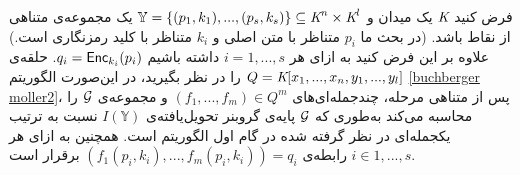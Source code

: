 \begin{proposition}
فرض کنید 
$\textit{K}$
یک میدان 
و 
$\mathbb{Y} = \{(p_{1}, k_{1}), ..., (p_{s},k_{s})\}\subseteq \textit{K}^{n}\times \textit{K}^{l}$
یک مجموعه‌ی متناهی از نقاط باشد. (در بحث ما 
$p_{i}$
متناظر با متن اصلی و 
$k_{i}$
متناظر با کلید رمزنگاری است.) علاوه بر این فرض کنید به ازای هر 
$i = 1,...,s$
داشته باشیم 
$q_{i} = \mathsf{Enc}_{k_{i}}(p_{i})$. 
حلقه‌ی 
$Q = \textit{K}[x_{1},...,x_{n},y_{1},...,y_{l}]$
را در نظر بگیرید، در این‌صورت الگوریتم 
\ref{buchberger moller2}، 
پس از متناهی مرحله، چندجمله‌ای‌های 
{\small $(f_{1},...,f_{m})\in Q^{m}$}
و مجموعه‌ی 
${\mathcal G}$
را محاسبه می‌کند به‌طوری که 
${\mathcal G}$
پایه‌ی گروبنر تحویل‌یافته‌ی 
$I(\mathbb{Y})$
نسبت به ترتیب یکجمله‌ای در نظر گرفته شده در گام اول الگوریتم است. همچنین به ازای هر 
$i\in 1,...,s$
رابطه‌ی 
$(f_{1}(p_{i},k_{i}),...,f_{m}(p_{i},k_{i})) = q_{i}$
برقرار است.


\end{proposition}
